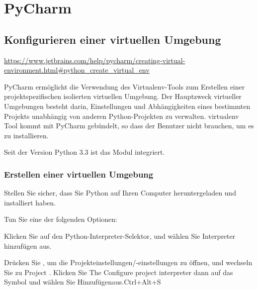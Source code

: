 %
%
%


\chapter{PyCharm}


\section{Konfigurieren einer virtuellen Umgebung}

\url{https://www.jetbrains.com/help/pycharm/creating-virtual-environment.html#python_create_virtual_env}


PyCharm ermöglicht die Verwendung des Virtualenv-Tools zum Erstellen einer projektspezifischen isolierten virtuellen Umgebung. Der Hauptzweck virtueller Umgebungen besteht darin, Einstellungen und Abhängigkeiten eines bestimmten Projekts unabhängig von anderen Python-Projekten zu verwalten. virtualenv Tool kommt mit PyCharm gebündelt, so dass der Benutzer nicht brauchen, um es zu installieren.

Seit der Version Python 3.3 ist das Modul  integriert.

\subsection{Erstellen einer virtuellen Umgebung}
 
\begin{enumerate} 
Stellen Sie sicher, dass Sie Python auf Ihren Computer heruntergeladen und installiert haben.

Tun Sie eine der folgenden Optionen:

Klicken Sie auf den Python-Interpreter-Selektor, und wählen Sie Interpreter hinzufügen aus.

Drücken Sie , um die Projekteinstellungen/-einstellungen zu öffnen, und wechseln Sie zu Project . Klicken Sie The Configure project interpreter dann auf das Symbol und wählen Sie Hinzufügenaus.Ctrl+Alt+S



\end{enumerate}

